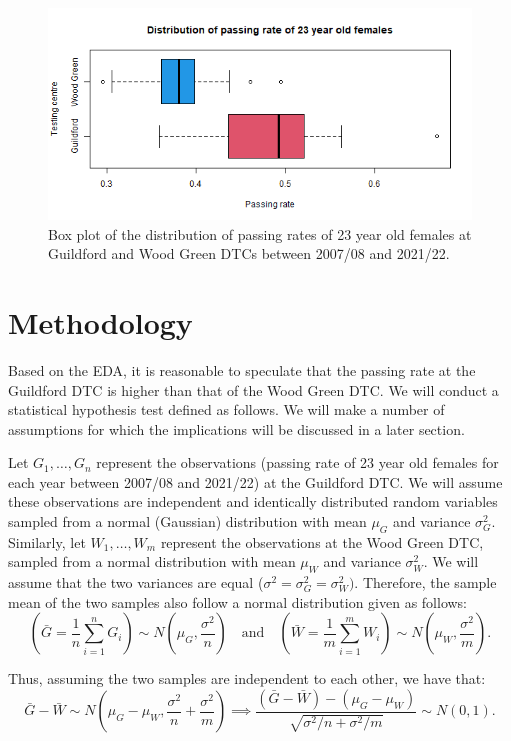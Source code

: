 \documentclass{article}
\begin{document}
\begin{figure}[ht!]
\centering
\includegraphics[width=\linewidth]{figures/box.png}
\caption{Box plot of the distribution of passing rates of 23 year old females at Guildford and Wood Green DTCs between 2007/08 and 2021/22.}
\label{box}
\end{figure}

\section*{Methodology}
Based on the EDA, it is reasonable to speculate that the passing rate at the Guildford DTC is higher than that of the Wood Green DTC. We will conduct a statistical hypothesis test defined as follows. We will make a number of assumptions for which the implications will be discussed in a later section. 

Let $G_1, \dots, G_n$ represent the observations (passing rate of 23 year old females for each year between 2007/08 and 2021/22) at the Guildford DTC. We will assume these observations are independent and identically distributed random variables sampled from a normal (Gaussian) distribution with mean $\mu_G$ and variance $\sigma_G^2$. Similarly, let $W_1, \dots, W_m$ represent the observations at the Wood Green DTC, sampled from a normal distribution with mean $\mu_W$ and variance $\sigma_W^2$. We will assume that the two variances are equal ($\sigma^2=\sigma_G^2=\sigma_W^2)$. Therefore, the sample mean of the two samples also follow a normal distribution given as follows:
$$
\left(\bar G = \frac{1}{n} \sum_{i=1}^n G_i \right)\sim N\left(\mu_G, \frac{\sigma^2}{n}\right) \quad \text{and} \quad \left( \bar W = \frac{1}{m} \sum_{i=1}^m W_i \right) \sim N\left(\mu_W, \frac{\sigma^2}{m}\right).
$$

Thus, assuming the two samples are independent to each other, we have that:
$$
\bar G - \bar W \sim N \left(\mu_G - \mu_W, \frac{\sigma^2}{n} + \frac{\sigma^2}{m}\right) \implies \frac{(\bar G - \bar W)-(\mu_G - \mu_W)}{\sqrt{\sigma^2/n + \sigma^2/m}} \sim N(0,1).
$$
\end{document}
